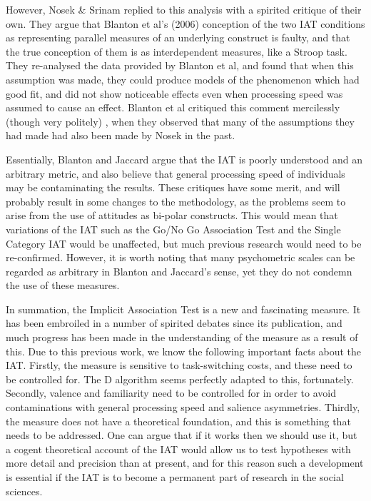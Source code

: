 However, Nosek \& Srinam \cite{Nosek2007} replied to this analysis with a spirited critique of their own. They argue that Blanton et al's (2006) conception of the two IAT conditions as representing parallel measures of an underlying construct is faulty, and that the true conception of them is as interdependent measures, like a Stroop task. They re-analysed the data provided by Blanton et al, and found that when this assumption was made, they could produce models of the phenomenon which had good fit, and did not show noticeable effects even when processing speed was assumed to cause an effect. Blanton et al critiqued this comment mercilessly (though very politely) \cite{Blanton2007}, when they observed that many of the assumptions they had made had also been made by Nosek in the past. 

Essentially, Blanton and Jaccard argue that the IAT is poorly understood and an arbitrary metric, and also believe that general processing speed of individuals may be contaminating the results. These critiques have some merit, and will probably result in some changes to the methodology, as the problems seem to arise from the use of attitudes as bi-polar constructs. This would mean that variations of the IAT such as the Go/No Go Association Test and the Single Category IAT would be unaffected, but much previous research would need to be re-confirmed. However, it is worth noting that many psychometric scales can be regarded as arbitrary in Blanton and Jaccard's sense, yet they do not condemn the use of these measures. 


In summation, the Implicit Association Test is a new and fascinating measure. It has been embroiled in a number of spirited debates since its publication, and much progress has been made in the understanding of the measure as a result of this. Due to this previous work, we know the following important facts about the IAT. Firstly, the measure is sensitive to task-switching costs, and these need to be controlled for. The D algorithm seems perfectly adapted to this, fortunately. Secondly, valence and familiarity need to be controlled for in order to avoid contaminations with general processing speed and salience asymmetries. Thirdly, the measure does not have a theoretical foundation, and this is something that needs to be addressed. One can argue that if it works then we should use it, but a cogent theoretical account of the IAT would allow us to test hypotheses with more detail and precision than at present, and for this reason such a development is essential if the IAT is to become a permanent part of research in the social sciences. 

